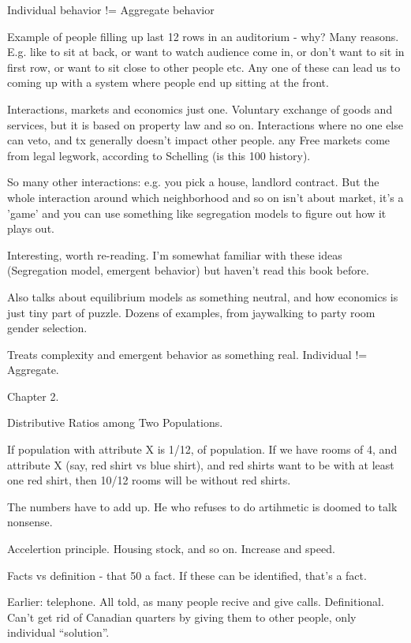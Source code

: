 \documentclass[12pt]{report}
\begin{document}
Individual behavior != Aggregate behavior

Example of people filling up last 12 rows in an auditorium - why? Many reasons.
E.g. like to sit at back, or want to watch audience come in, or don't want to
sit in first row, or want to sit close to other people etc. Any one of these can
lead us to coming up with a system where people end up sitting at the front.

Interactions, markets and economics just one. Voluntary exchange of goods and
services, but it is based on property law and so on. Interactions where no one
else can veto, and tx generally doesn't impact other people. any Free markets
come from legal legwork, according to Schelling (is this 100%
history).

So many other interactions: e.g. you pick a house, landlord contract. But the
whole interaction around which neighborhood and so on isn't about market, it's a
'game' and you can use something like segregation models to figure out how it
plays out.

Interesting, worth re-reading. I'm somewhat familiar with these ideas
(Segregation model, emergent behavior) but haven't read this book before.

Also talks about equilibrium models as something neutral, and how economics is
just tiny part of puzzle. Dozens of examples, from jaywalking to party room gender
selection.

Treats complexity and emergent behavior as something real. Individual != Aggregate.

Chapter 2.

Distributive Ratios among Two Populations.

If population with attribute X is 1/12, of population. If we have rooms of 4,
and attribute X (say, red shirt vs blue shirt), and red shirts want to be with
at least one red shirt, then 10/12 rooms will be without red shirts.

The numbers have to add up. He who refuses to do artihmetic is doomed to talk nonsense.

Accelertion principle. Housing stock, and so on. Increase and speed.

Facts vs definition - that 50%
a fact. If these can be identified, that's a fact.

Earlier: telephone. All told, as many people recive and give calls.
Definitional. Can't get rid of Canadian quarters by giving them to other people,
only individual ``solution''.
\end{document}
